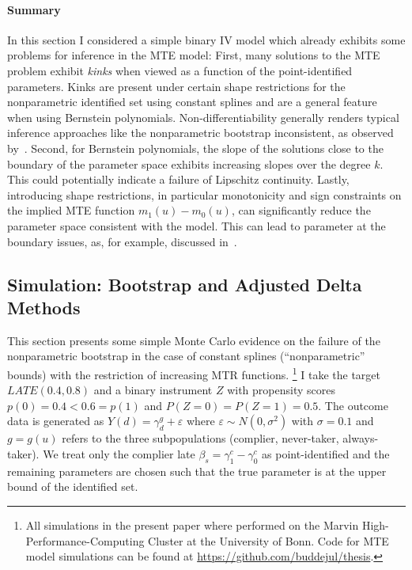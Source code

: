 \documentclass[12pt,a4paper,english]{article} %
\numberwithin{equation}{section}
\theoremstyle{definition}
\theoremstyle{remark}
\theoremstyle{plain}
\begin{document}
\paragraph{Summary}
In this section I considered a simple binary IV model which already exhibits some problems for inference in the MTE model:
First, many solutions to the MTE problem exhibit \textit{kinks} when viewed as a function of the point-identified parameters.
Kinks are present under certain shape restrictions for the nonparametric identified set using constant splines and are a general feature when using Bernstein polynomials.
Non-differentiability generally renders typical inference approaches like the nonparametric bootstrap inconsistent, as observed by~\cite{dumbgen1993nondifferentiable}.
Second, for Bernstein polynomials, the slope of the solutions close to the boundary of the parameter space exhibits increasing slopes over the degree $k$.
This could potentially indicate a failure of Lipschitz continuity.
Lastly, introducing shape restrictions, in particular monotonicity and sign constraints on the implied MTE function $m_1(u) - m_0(u)$, can significantly reduce the parameter space consistent with the model.
This can lead to parameter at the boundary issues, as, for example, discussed in~\cite{andrews1999estimation}.


\subsection{Simulation: Bootstrap and Adjusted Delta Methods}
This section presents some simple Monte Carlo evidence on the failure of the nonparametric bootstrap in the case of constant splines (``nonparametric'' bounds) with the restriction of increasing MTR functions.
\footnote{All simulations in the present paper where performed on the Marvin High-Performance-Computing Cluster at the University of Bonn.
Code for MTE model simulations can be found at \url{https://github.com/buddejul/thesis}.}
I take the target $LATE(0.4, 0.8)$ and a binary instrument $Z$ with propensity scores $p(0) = 0.4 < 0.6 = p(1)$ and $P(Z=0)=P(Z=1)=0.5$.
The outcome data is generated as $Y(d) = \gamma_d^g + \varepsilon$ where $\varepsilon \sim N(0,\sigma^2)$ with $\sigma=0.1$ and $g=g(u)$ refers to the three subpopulations (complier, never-taker, always-taker).
We treat only the complier late $\beta_s = \gamma_1^c - \gamma_0^c$ as point-identified and the remaining parameters are chosen such that the true parameter is at the upper bound of the identified set.
\end{document}
